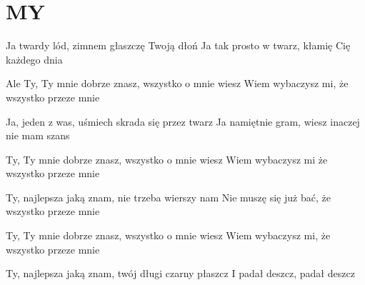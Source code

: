 \documentclass[../../../songbook.tex]{subfiles}
\begin{document}
\TabPositions{8cm} %
\section*{MY}
{}
\vspace{0.5cm}

Ja twardy lód, zimnem głaszczę Twoją dłoń		 \newline
Ja tak prosto w twarz, kłamię Cię każdego dnia		 \newline

\-\hspace{0.5cm} Ale Ty, Ty mnie dobrze znasz, wszystko o mnie wiesz	 \newline
\-\hspace{0.5cm} Wiem wybaczysz mi, że wszystko przeze mnie		 \tab \quad \quad \quad {}\newline

Ja, jeden z was, uśmiech skrada się przez twarz \newline
Ja namiętnie gram, wiesz inaczej nie mam szans \newline

\-\hspace{1cm} Ty, Ty mnie dobrze znasz, wszystko o mnie wiesz \newline
\-\hspace{1cm} Wiem wybaczysz mi że wszystko przeze mnie \newline

\-\hspace{1cm} Ty, najlepsza jaką znam, nie trzeba wierszy nam \newline
\-\hspace{1cm} Nie muszę się już bać, że wszystko przeze mnie \newline

\-\hspace{1cm} Ty, Ty mnie dobrze znasz, wszystko o mnie wiesz \newline
\-\hspace{1cm} Wiem wybaczysz mi, że wszystko przeze mnie \newline
 
\-\hspace{1cm} Ty, najlepsza jaką znam, twój długi czarny płaszcz \newline
\-\hspace{1cm} I padał deszcz, padał deszcz \newline
	
\end{document}
